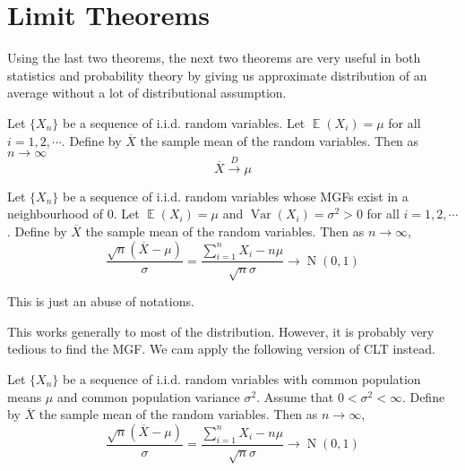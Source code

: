 \documentclass{huhtakm-template-book-v2}
\DeclareMathOperator{\E}{\mathbb{E}}
\DeclareMathOperator{\Var}{Var}
\DeclareMathOperator{\N}{N}
\begin{document}
\section{Limit Theorems}
Using the last two theorems, the next two theorems are very useful in both statistics and probability theory by giving us approximate distribution of an average without a lot of distributional assumption.
\begin{thm}
	Let $\{X_{n}\}$ be a sequence of i.i.d. random variables. Let $\E(X_{i})=\mu$ for all $i=1,2,\cdots$. Define by $\overline{X}$ the sample mean of the random variables. Then as $n\to\infty$
	\begin{equation*}
		\overline{X}\xrightarrow{D}\mu
	\end{equation*}
\end{thm}
\begin{thm}
	Let $\{X_{n}\}$ be a sequence of i.i.d. random variables whose MGFs exist in a neighbourhood of $0$. Let $\E(X_{i})=\mu$ and $\Var(X_{i})=\sigma^{2}>0$ for all $i=1,2,\cdots$. Define by $\overline{X}$ the sample mean of the random variables. Then as $n\to\infty$,
	\begin{equation*}
		\frac{\sqrt{n}(\overline{X}-\mu)}{\sigma}=\frac{\sum_{i=1}^{n}X_{i}-n\mu}{\sqrt{n}\sigma}\to\N(0,1)
	\end{equation*}
\end{thm}
\begin{rem}
	This is just an abuse of notations.
\end{rem}
This works generally to most of the distribution. However, it is probably very tedious to find the MGF. We cam apply the following version of CLT instead.
\begin{thm}
	Let $\{X_{n}\}$ be a sequence of i.i.d. random variables with common population means $\mu$ and common population variance $\sigma^{2}$. Assume that $0<\sigma^{2}<\infty$. Define by $\overline{X}$ the sample mean of the random variables. Then as $n\to\infty$,
	\begin{equation*}
		\frac{\sqrt{n}(\overline{X}-\mu)}{\sigma}=\frac{\sum_{i=1}^{n}X_{i}-n\mu}{\sqrt{n}\sigma}\to\N(0,1)
	\end{equation*}
\end{thm}
\end{document}
